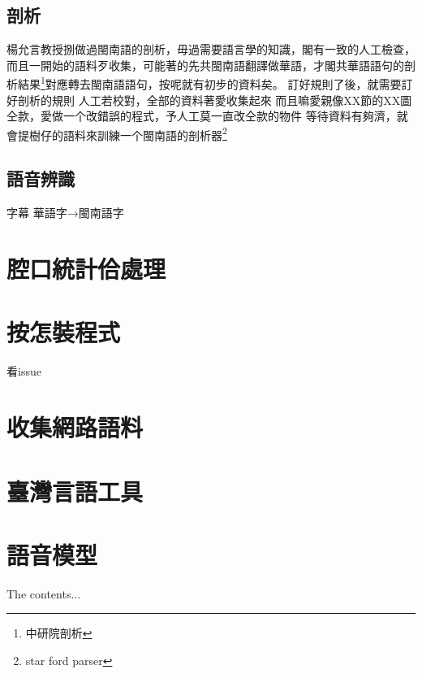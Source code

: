 \documentclass[final,oneside,onecolumn,12pt,a4paper]{book}%
\begin{document}
\section{剖析}
\label{節：未來剖析}
楊允言教授捌做過閩南語的剖析，毋過需要語言學的知識，閣有一致的人工檢查，而且一開始的語料歹收集，可能著的先共閩南語翻譯做華語，才閣共華語語句的剖析結果\footnote{中研院剖析}對應轉去閩南語語句，按呢就有初步的資料矣。
訂好規則了後，就需要訂好剖析的規則
人工若校對，全部的資料著愛收集起來
而且嘛愛親像XX節的XX圖仝款，愛做一个改錯誤的程式，予人工莫一直改仝款的物件
等待資料有夠濟，就會提樹仔的語料來訓練一个閩南語的剖析器\footnote{star ford parser}


\section{語音辨識}
\label{節：未來辨識}
字幕 華語字→閩南語字




\begin{appendices}
\chapter{腔口統計佮處理}
\label{章：腔口統計佮處理}
\chapter{按怎裝程式}
\label{章：按怎裝程式}
看issue
\chapter{收集網路語料}
\label{章：收集網路語料}
\chapter{臺灣言語工具}
\label{章：臺灣言語工具}
\chapter{語音模型}
\label{章：語音模型}
The contents...
\end{appendices}
\end{document}
